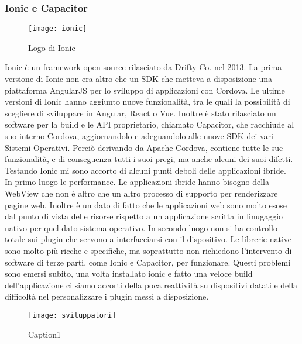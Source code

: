 \subsubsection{Ionic e Capacitor}

\begin{figure}[h]
	\begin{center}
		\texttt{[image: ionic]}
		\caption{Logo di Ionic}
	\end{center}
\end{figure}

Ionic è un framework open-source rilasciato da Drifty Co. nel 2013. La prima versione di Ionic non era altro che un SDK che metteva a disposizione una
piattaforma AngularJS per lo sviluppo di applicazioni con Cordova. Le ultime versioni di Ionic hanno aggiunto nuove funzionalità, tra le
quali la possibilità di scegliere di sviluppare in Angular, React o Vue. Inoltre è stato rilasciato un software per la build e le API proprietario,
chiamato Capacitor, che racchiude al suo interno Cordova, aggiornandolo e adeguandolo alle nuove SDK dei vari Sistemi Operativi. Perciò derivando
da Apache Cordova, contiene tutte le sue funzionalità, e di conseguenza tutti i suoi pregi, ma anche alcuni dei suoi difetti. \\
Testando Ionic mi sono accorto di alcuni punti deboli delle applicazioni ibride. \\
In primo luogo le performance. Le applicazioni ibride hanno bisogno della WebView che non è altro che un altro processo di supporto per
renderizzare pagine web. Inoltre è un dato di fatto che le applicazioni web sono molto esose dal punto di vista delle risorse rispetto a un
applicazione scritta in linugaggio nativo per quel dato sistema operativo. In secondo luogo non si ha controllo totale sui plugin che
servono a interfacciarsi con il dispositivo. Le librerie native sono molto più ricche e specifiche, ma soprattutto non richiedono
l'intervento di software di terze parti, come Ionic e Capacitor, per funzionare. Questi problemi sono emersi subito, una volta installato
ionic e fatto una veloce build dell'applicazione ci siamo accorti della poca reattività su dispositivi datati e della difficoltà nel
personalizzare i plugin messi a disposizione. \\

\begin{wrapfigure}{l}{0.45\textwidth}
  \texttt{[image: sviluppatori]} 
  \caption{Caption1}
  \label{fig:sviluppatori}
\end{wrapfigure}

